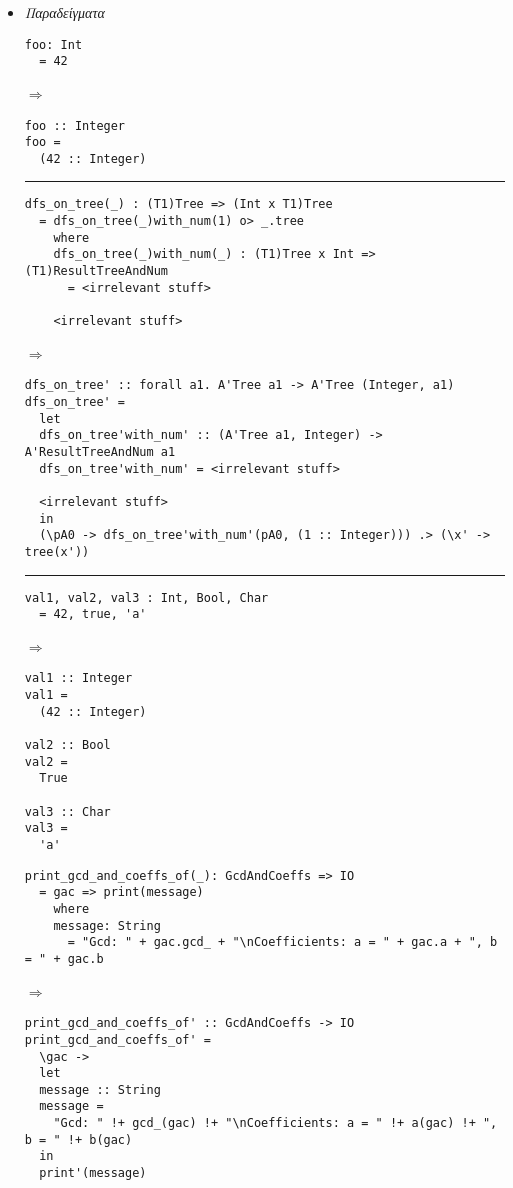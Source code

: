 \documentclass[diploma]{softlab-thesis}
\def\lra{$\Longrightarrow$\ }
\begin{document}
\begin{itemize}
\item
\textit{Παραδείγματα}
\begin{verbatim}
foo: Int
  = 42
\end{verbatim}
\lra
\begin{verbatim}
foo :: Integer
foo =
  (42 :: Integer)
\end{verbatim}

\rule{\linewidth}{0.1pt}

\begin{verbatim}
dfs_on_tree(_) : (T1)Tree => (Int x T1)Tree
  = dfs_on_tree(_)with_num(1) o> _.tree
    where
    dfs_on_tree(_)with_num(_) : (T1)Tree x Int => (T1)ResultTreeAndNum
      = <irrelevant stuff>

    <irrelevant stuff>
\end{verbatim} \lra
\begin{verbatim}
dfs_on_tree' :: forall a1. A'Tree a1 -> A'Tree (Integer, a1)
dfs_on_tree' =
  let
  dfs_on_tree'with_num' :: (A'Tree a1, Integer) -> A'ResultTreeAndNum a1
  dfs_on_tree'with_num' = <irrelevant stuff>

  <irrelevant stuff>
  in
  (\pA0 -> dfs_on_tree'with_num'(pA0, (1 :: Integer))) .> (\x' -> tree(x'))
\end{verbatim}

\rule{\linewidth}{0.1pt}

\begin{verbatim}
val1, val2, val3 : Int, Bool, Char
  = 42, true, 'a'
\end{verbatim} \lra
\begin{verbatim}
val1 :: Integer
val1 =
  (42 :: Integer)

val2 :: Bool
val2 =
  True

val3 :: Char
val3 =
  'a'
\end{verbatim}

\newpage

\begin{verbatim}
print_gcd_and_coeffs_of(_): GcdAndCoeffs => IO
  = gac => print(message)
    where
    message: String
      = "Gcd: " + gac.gcd_ + "\nCoefficients: a = " + gac.a + ", b = " + gac.b
\end{verbatim}
\lra
\begin{verbatim}
print_gcd_and_coeffs_of' :: GcdAndCoeffs -> IO
print_gcd_and_coeffs_of' =
  \gac ->
  let
  message :: String
  message =
    "Gcd: " !+ gcd_(gac) !+ "\nCoefficients: a = " !+ a(gac) !+ ", b = " !+ b(gac)
  in
  print'(message)
\end{verbatim}


\end{itemize}
\end{document}
